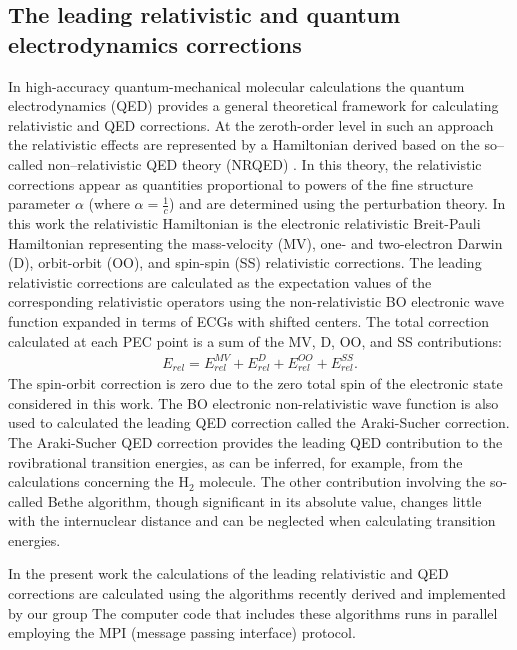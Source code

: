 \documentclass[aps,onecolumn]{revtex4}
\begin{document}
\subsection{The leading relativistic and quantum electrodynamics corrections}


In high-accuracy quantum-mechanical molecular calculations
the quantum electrodynamics (QED) provides a
general theoretical framework
for calculating relativistic and QED corrections.
At the zeroth-order level in such an approach 
the relativistic effects are represented by
a Hamiltonian derived based on the so--called non--relativistic QED
theory (NRQED) \cite{d17,d18,d19,d20}.
In this theory, the relativistic corrections
appear as quantities proportional to powers of
the fine structure parameter $\alpha$ (where $\alpha = \frac{1}{c}$)
and are determined using the perturbation theory.
In this work the relativistic Hamiltonian is the
electronic relativistic Breit-Pauli Hamiltonian \cite{BS1977}
representing the mass-velocity (MV), one- and two-electron
Darwin (D), orbit-orbit (OO), and spin-spin (SS) relativistic corrections.
The leading relativistic corrections are calculated as the expectation values
of the corresponding relativistic operators using the non-relativistic
BO electronic wave function expanded in terms of
ECGs with shifted centers. The total correction calculated
at each PEC point is a sum of the MV, D, OO, and SS contributions:
\begin{eqnarray}
E_{rel} = E_{rel}^{MV} +  E_{rel}^{D} +  E_{rel}^{OO} +  E_{rel}^{SS}.
\end{eqnarray}
The spin-orbit correction is zero due to the zero total spin
of the electronic state considered in this work. 
The BO electronic non-relativistic wave function
is also used to calculated the leading QED correction
called the Araki-Sucher correction.
The Araki-Sucher QED correction \cite{Be,Ar,Su} provides the leading
QED contribution to the rovibrational transition energies, as can be inferred, for example,
from the calculations concerning the H$_2$ molecule\cite{Jeziorski}.
The other contribution involving the so-called Bethe algorithm,
though significant in its absolute value, changes little with the internuclear
distance and can be neglected when calculating transition energies.

In the present work the calculations of the leading
relativistic and QED corrections are calculated using 
the algorithms recently derived and implemented by our group \cite{ms1,ms2,ms3}
The computer code that includes these algorithms runs in parallel
employing the MPI (message passing interface) protocol.
\end{document}

